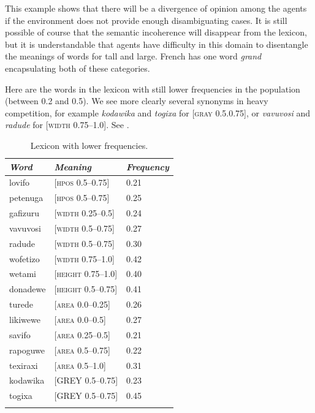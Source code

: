 This example shows that there will be a divergence of 
opinion among the agents if the environment does not 
provide enough 
disambiguating cases. It is still possible of course that 
the semantic incoherence will disappear from the lexicon, 
but it is understandable that agents have difficulty 
in this domain to disentangle the meanings of words for 
tall and large. French has one word \textit{grand} encapsulating
both of these categories.

Here are the words in the lexicon with still lower 
frequencies in the population (between 0.2 and 0.5). We see
more clearly several synonyms in heavy competition, for example 
\textit{kodawika} and \textit{togixa} for [\textsc{gray} 0.5.0.75], or 
\textit{vavuvosi} and \textit{radude} for [\textsc{width} 0.75–1.0]. See . 


\begin{table}
\begin{center}
\begin{tabular}{ l  l  l }
\lsptoprule
{\itshape Word}&{\itshape Meaning} & {\itshape Frequency} \\ \midrule
lovifo & [\textsc{hpos} 0.5–0.75] & 0.21 \\ 
petenuga & [\textsc{hpos} 0.5–0.75] & 0.25 \\ 
gafizuru & [\textsc{width} 0.25–0.5] & 0.24 \\ 
vavuvosi & [\textsc{width} 0.5–0.75] & 0.27 \\ 
radude & [\textsc{width} 0.5–0.75] & 0.30 \\ 
wofetizo & [\textsc{width} 0.75–1.0] & 0.42 \\ 
wetami & [\textsc{height} 0.75–1.0] & 0.40 \\ 
donadewe & [\textsc{height} 0.5–0.75] & 0.41 \\ 
turede & [\textsc{area} 0.0–0.25] & 0.26 \\ 
likiwewe & [\textsc{area} 0.0–0.5] & 0.27 \\ 
savifo & [\textsc{area} 0.25–0.5] & 0.21 \\ 
rapoguwe & [\textsc{area} 0.5–0.75] & 0.22 \\ 
texiraxi & [\textsc{area} 0.5–1.0] & 0.31 \\ 
kodawika & [GREY 0.5–0.75] & 0.23 \\ 
togixa & [GREY 0.5–0.75] & 0.45 \\ 
\lspbottomrule
\end{tabular}
\caption{\label{tab:comp}Lexicon with lower frequencies.}
\end{center}
\end{table}

